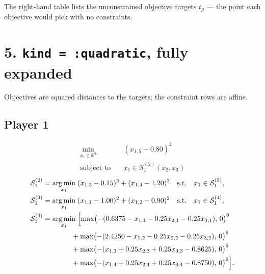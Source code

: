 \documentclass[11pt]{article}
\newcommand{\argmin}{\operatorname*{arg\,min}}
\begin{document}
\noindent
The right-hand table lists the unconstrained objective targets \(t_p\) --- the point each
objective would pick with no constraints.

\section*{5. \texttt{kind = :quadratic}, fully expanded}

Objectives are squared distances to the targets; the constraint rows are affine.

\subsection*{Player 1}
\[
\begin{aligned}
  \min_{x_1 \in \mathbb{R}^5} \quad & (x_{1,5}-0.80)^2 \\
  \text{subject to} \quad & x_1 \in \mathcal{S}_1^{(2)}(x_2,x_3)
\end{aligned}
\]
\[
\begin{aligned}
  \mathcal{S}_1^{(2)} &= \argmin_{x_1} \;
    (x_{1,3}-0.15)^2 + (x_{1,4}-1.20)^2
    \quad \text{s.t.} \quad x_1 \in \mathcal{S}_1^{(3)}, \\
  \mathcal{S}_1^{(3)} &= \argmin_{x_1} \;
    (x_{1,1}-1.00)^2 + (x_{1,2}-0.90)^2
    \quad \text{s.t.} \quad x_1 \in \mathcal{S}_1^{(4)}, \\
  \mathcal{S}_1^{(4)} &= \argmin_{x_1} \;
    \Bigl[ \max\bigl(-(0.6375 - x_{1,1} - 0.25x_{2,1} - 0.25x_{3,1}),\,0\bigr)^6 \\
    &\qquad\qquad + \max\bigl(-(2.4250 - x_{1,2} - 0.25x_{2,2} - 0.25x_{3,2}),\,0\bigr)^6 \\
    &\qquad\qquad + \max\bigl(-(x_{1,3} + 0.25x_{2,3} + 0.25x_{3,3} - 0.8625),\,0\bigr)^6 \\
    &\qquad\qquad + \max\bigl(-(x_{1,4} + 0.25x_{2,4} + 0.25x_{3,4} - 0.8750),\,0\bigr)^6 \Bigr].
\end{aligned}
\]
\end{document}
